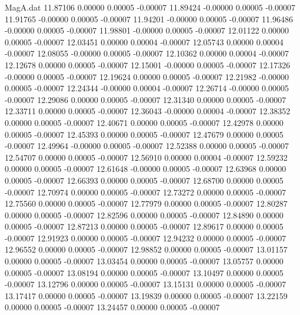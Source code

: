 \begin{filecontents}{MagA.dat}
  11.87106    0.00000    0.00005   -0.00007
  11.89424   -0.00000    0.00005   -0.00007
  11.91765   -0.00000    0.00005   -0.00007
  11.94201   -0.00000    0.00005   -0.00007
  11.96486   -0.00000    0.00005   -0.00007
  11.98801   -0.00000    0.00005   -0.00007
  12.01122    0.00000    0.00005   -0.00007
  12.03451    0.00000    0.00004   -0.00007
  12.05743    0.00000    0.00004   -0.00007
  12.08055   -0.00000    0.00005   -0.00007
  12.10362    0.00000    0.00004   -0.00007
  12.12678    0.00000    0.00005   -0.00007
  12.15001   -0.00000    0.00005   -0.00007
  12.17326   -0.00000    0.00005   -0.00007
  12.19624    0.00000    0.00005   -0.00007
  12.21982   -0.00000    0.00005   -0.00007
  12.24344   -0.00000    0.00004   -0.00007
  12.26714   -0.00000    0.00005   -0.00007
  12.29086    0.00000    0.00005   -0.00007
  12.31340    0.00000    0.00005   -0.00007
  12.33711    0.00000    0.00005   -0.00007
  12.36043   -0.00000    0.00004   -0.00007
  12.38352    0.00000    0.00005   -0.00007
  12.40671    0.00000    0.00005   -0.00007
  12.42978    0.00000    0.00005   -0.00007
  12.45393    0.00000    0.00005   -0.00007
  12.47679    0.00000    0.00005   -0.00007
  12.49964   -0.00000    0.00005   -0.00007
  12.52388    0.00000    0.00005   -0.00007
  12.54707    0.00000    0.00005   -0.00007
  12.56910    0.00000    0.00004   -0.00007
  12.59232    0.00000    0.00005   -0.00007
  12.61648   -0.00000    0.00005   -0.00007
  12.63968    0.00000    0.00005   -0.00007
  12.66393    0.00000    0.00005   -0.00007
  12.68700    0.00000    0.00005   -0.00007
  12.70974    0.00000    0.00005   -0.00007
  12.73272    0.00000    0.00005   -0.00007
  12.75560    0.00000    0.00005   -0.00007
  12.77979    0.00000    0.00005   -0.00007
  12.80287    0.00000    0.00005   -0.00007
  12.82596    0.00000    0.00005   -0.00007
  12.84890    0.00000    0.00005   -0.00007
  12.87213    0.00000    0.00005   -0.00007
  12.89617    0.00000    0.00005   -0.00007
  12.91923    0.00000    0.00005   -0.00007
  12.94232    0.00000    0.00005   -0.00007
  12.96552    0.00000    0.00005   -0.00007
  12.98852    0.00000    0.00005   -0.00007
  13.01157    0.00000    0.00005   -0.00007
  13.03454    0.00000    0.00005   -0.00007
  13.05757    0.00000    0.00005   -0.00007
  13.08194    0.00000    0.00005   -0.00007
  13.10497    0.00000    0.00005   -0.00007
  13.12796    0.00000    0.00005   -0.00007
  13.15131    0.00000    0.00005   -0.00007
  13.17417    0.00000    0.00005   -0.00007
  13.19839    0.00000    0.00005   -0.00007
  13.22159    0.00000    0.00005   -0.00007
  13.24457    0.00000    0.00005   -0.00007

\end{filecontents}
